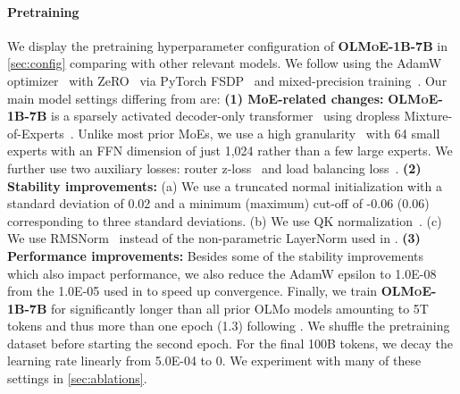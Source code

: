 \documentclass{article}
\newcommand{\modelsmall}{\textbf{\textsc{OLMoE-1B-7B}}}
\begin{document}
\paragraph{Pretraining} We display the pretraining hyperparameter configuration of \modelsmall{} in \autoref{sec:config} comparing with other relevant models. We follow \citet{groeneveld2024olmo} using the AdamW optimizer~\citep{loshchilov2019decoupled} with ZeRO~\citep{rajbhandari2020zero} via PyTorch FSDP~\citep{zhao2023pytorch} and mixed-precision training~\citep{micikevicius2018mixed}. Our main model settings differing from \citet{groeneveld2024olmo} are: \textbf{(1) MoE-related changes:} \modelsmall{} is a sparsely activated decoder-only transformer~\citep{vaswani2023attention} using dropless Mixture-of-Experts~\citep{gale2022megablocksefficientsparsetraining}. Unlike most prior MoEs, we use a high granularity~\citep{dai2024deepseekmoeultimateexpertspecialization,krajewski2024scaling} with 64 small experts with an FFN dimension of just 1,024 rather than a few large experts. We further use two auxiliary losses: router z-loss~\citep{zoph2022stmoe} and load balancing loss~\citep{shazeer2017outrageously}. \textbf{(2) Stability improvements:} (a) We use a truncated normal initialization with a standard deviation of 0.02 and a minimum (maximum) cut-off of -0.06 (0.06) corresponding to three standard deviations. (b) We use QK normalization~\citep{chameleonteam2024chameleon,mehta2024openelm,dehghani2023scaling}. (c) We use RMSNorm~\citep{zhang2019rootmeansquarelayer} instead of the non-parametric LayerNorm used in \citet{groeneveld2024olmo}. \textbf{(3) Performance improvements:} Besides some of the stability improvements which also impact performance, we also reduce the AdamW epsilon to 1.0E-08 from the 1.0E-05 used in \citet{groeneveld2024olmo} to speed up convergence. Finally, we train \modelsmall{} for significantly longer than all prior OLMo models amounting to 5T tokens and thus more than one epoch (1.3) following \citet{muennighoff2023scaling}. We shuffle the pretraining dataset before starting the second epoch. For the final 100B tokens, we decay the learning rate linearly from 5.0E-04 to 0. We experiment with many of these settings in \autoref{sec:ablations}.
\end{document}
